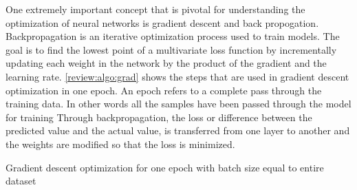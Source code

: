 One extremely important concept that is pivotal for understanding the
optimization of neural networks is gradient descent and back propogation.
Backpropagation is an iterative optimization process used to train models. The
goal is to find the lowest point of a multivariate loss function by
incrementally updating each weight in the network by the product of the gradient
and the learning rate. \autoref{review:algo:grad} shows the steps that are used
in gradient descent optimization in one epoch. An epoch refers to a complete
pass through the training data. In other words all the samples have been passed
through the model for training Through backpropagation, the loss or difference
between the predicted value and the actual value, is transferred from one layer
to another and the weights are modified so that the loss is minimized.

\begin{algorithm}[!t] \AlgoFontSize \DontPrintSemicolon {} 
  \BlankLine


  \BlankLine


  \BlankLine

  \BlankLine


  \caption{Gradient descent optimization for one epoch with batch size equal to entire dataset}
  \label{review:algo:grad}
\end{algorithm}

